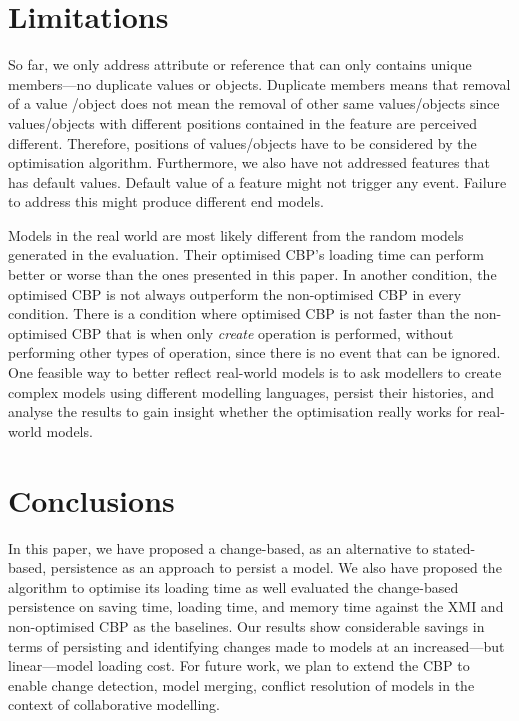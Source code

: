 \documentclass{llncs}
\begin{document}
\section{Limitations}
\label{sec:limitations}
So far, we only address attribute or reference that can only contains unique members---no duplicate values or objects. Duplicate members means that removal of a value /object does not mean the removal of other same values/objects since values/objects with different positions contained in the feature are perceived different. Therefore, positions of values/objects have to be considered by the optimisation algorithm. Furthermore, we also have not addressed features that has default values. Default value of a feature might not trigger any event. Failure to address this might produce different end models. 

Models in the real world are most likely different from the random models generated in the evaluation. Their optimised CBP's loading time can perform better or worse than the ones presented in this paper. In another condition, the optimised CBP is not always outperform the non-optimised CBP in every condition. There is a condition where optimised CBP is not faster than the non-optimised CBP that is when only \emph{create} operation is performed, without performing other types of operation, since there is no event that can be ignored. One feasible way to better reflect real-world models is to ask modellers to create complex models using different modelling languages, persist their histories, and analyse the results to gain insight whether the optimisation really works for real-world models. 

\section{Conclusions}
\label{sec:conclusions}
In this paper, we have proposed a change-based, as an alternative to stated-based, persistence as an approach to persist a model. We also have proposed the algorithm to optimise its loading time as well evaluated the change-based persistence on saving time, loading time, and memory time against the XMI and non-optimised CBP as the baselines. Our results show considerable savings in terms of persisting and identifying changes made to models at an increased---but linear---model loading cost. For future work, we  plan to extend the CBP to enable change detection, model merging, conflict resolution of models in the context of collaborative modelling.


 

\end{document}
